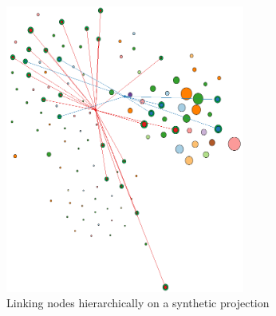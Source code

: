 \begin{figure}[H]
	\centering
	\includegraphics[width=0.7\textwidth]{figures/hier_two_sim_graph.png}
	\caption{Linking nodes hierarchically on a synthetic projection}
	\label{fig:hier_two_sim_graph}
\end{figure}
